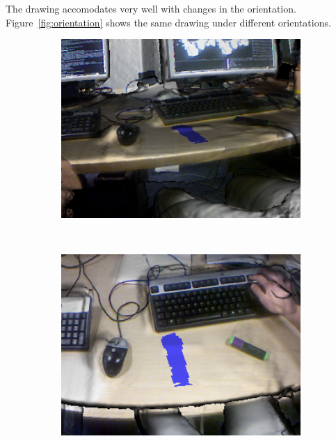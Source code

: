 \documentclass[12pt, twoside]{article}
\begin{document}
The drawing accomodates very well with changes in the orientation. Figure~\ref{fig:orientation} shows the same drawing under different orientations.

\begin{figure}[h]
  \centering
  \begin{subfigure}[t]{0.5\textwidth}
    \includegraphics[width=1\textwidth]{Orientation1.png}
    \caption{}
  \end{subfigure}~
  \begin{subfigure}[t]{0.5\textwidth}
    \includegraphics[width=1\textwidth]{Orientation2.png}
    \caption{}
    \end{subfigure}~\\
  \begin{subfigure}[t]{0.5\textwidth}

\end{subfigure}
\end{figure}
\end{document}
